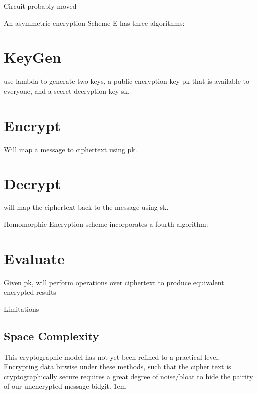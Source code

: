 \documentclass[a0,portrait]{a0poster}
\begin{document}
\begin{multicols}{2}
\begin{slide}{Circuit probably moved}


An asymmetric encryption Scheme E has three algorithms:


\section*{KeyGen}

use lambda to generate two keys, a public encryption key pk that is available to everyone, and a secret decryption key sk.


\section*{Encrypt}

Will map a message to ciphertext using pk.

\section*{Decrypt}

will map the ciphertext back to the message using sk.


Homomorphic Encryption scheme incorporates a fourth algorithm:


\section*{Evaluate}

Given pk, will perform operations over ciphertext to produce equivalent encrypted results



\end{slide}



\begin{slide}{Limitations}
\subsection*{Space Complexity}
  This cryptographic model has not yet been refined to a practical level. Encrypting data bitwise under these methods, such that the cipher text is cryptographically secure requires a great degree of noise/bloat to hide the pairity of our unencrypted message bidgit. 
\parskip 1em



\end{slide}
\end{multicols}
\end{document}
